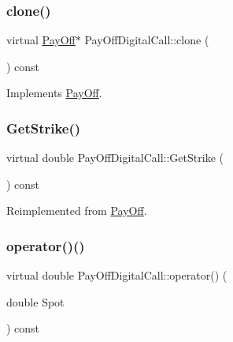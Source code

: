 \subsubsection{\texorpdfstring{clone()}{clone()}}
{\footnotesize\ttfamily virtual \hyperlink{classPayOff}{Pay\+Off}$\ast$ Pay\+Off\+Digital\+Call\+::clone (\begin{DoxyParamCaption}{ }\end{DoxyParamCaption}) const\hspace{0.3cm}{\ttfamily [virtual]}}



Implements \hyperlink{classPayOff_ad8194d5b82247ae89c25c515f0ba806a}{Pay\+Off}.

\hypertarget{classPayOffDigitalCall_ad8953d367e291925ab5d963f57ed35bc}{}\label{classPayOffDigitalCall_ad8953d367e291925ab5d963f57ed35bc} 
\subsubsection{\texorpdfstring{Get\+Strike()}{GetStrike()}}
{\footnotesize\ttfamily virtual double Pay\+Off\+Digital\+Call\+::\+Get\+Strike (\begin{DoxyParamCaption}{ }\end{DoxyParamCaption}) const\hspace{0.3cm}{\ttfamily [virtual]}}



Reimplemented from \hyperlink{classPayOff_aa7a2451e286496c8d5a153000a818d34}{Pay\+Off}.

\hypertarget{classPayOffDigitalCall_a719ac152051a88a7a6a34d2431bc15b0}{}\label{classPayOffDigitalCall_a719ac152051a88a7a6a34d2431bc15b0} 
\subsubsection{\texorpdfstring{operator()()}{operator()()}}
{\footnotesize\ttfamily virtual double Pay\+Off\+Digital\+Call\+::operator() (\begin{DoxyParamCaption}\item[{double}]{Spot }\end{DoxyParamCaption}) const\hspace{0.3cm}{\ttfamily [virtual]}}



